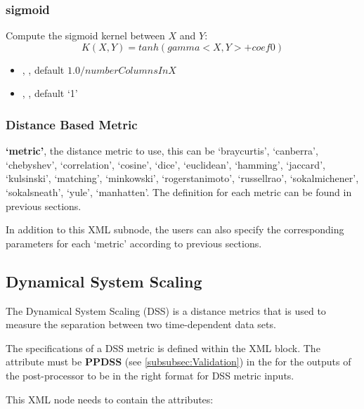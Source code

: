\subsubsection{sigmoid}
Compute the sigmoid kernel between $X$ and $Y$:
\begin{equation}
  K(X, Y) = tanh(gamma <X, Y> + coef0)
\end{equation}
\begin{itemize}
  \item {}, , default $1.0/numberColumnsInX$
  \item {}, , default `1'
\end{itemize}

\subsubsection{Distance Based Metric}


\nb \textbf{`metric'}, the distance metric to use, this can be `braycurtis', `canberra', `chebyshev', `correlation',
`cosine', `dice', `euclidean', `hamming', `jaccard', `kulsinski', `matching', `minkowski', `rogerstanimoto',
`russellrao', `sokalmichener', `sokalsneath', `yule', `manhatten'. The definition for each metric can be found
in previous sections.

In addition to this XML subnode, the users can also specify the corresponding parameters for each `metric' according to
previous sections.

\subsection{Dynamical System Scaling}
\label{subsection:DSS}
The Dynamical System Scaling (DSS) is a distance metrics that is used to measure the separation
between two time-dependent data sets.

The specifications of a DSS metric is defined within the  XML block. The attribute  must be \textbf{PPDSS} (see \ref{subsubsec:Validation}) in the  for the outputs of the post-processor to be in the right format for DSS metric inputs.

This XML node needs to contain the attributes:

